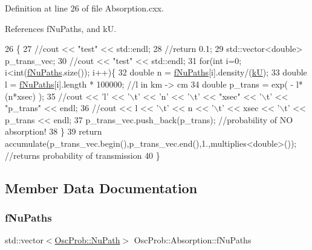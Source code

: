 Definition at line 26 of file Absorption.\+cxx.



References f\+Nu\+Paths, and kU.


\begin{DoxyCode}
26                                    \{
27   \textcolor{comment}{//cout << "test" << std::endl;}
28   \textcolor{comment}{//return 0.1;}
29   std::vector<double> p\_trans\_vec;
30   \textcolor{comment}{//cout << "test" << std::endl;}
31   \textcolor{keywordflow}{for}(\textcolor{keywordtype}{int} i=0; i<int(\hyperlink{classOscProb_1_1Absorption_aabe51d0748a0d48972780811e90acf69}{fNuPaths}.size()); i++)\{
32     \textcolor{keywordtype}{double} n = \hyperlink{classOscProb_1_1Absorption_aabe51d0748a0d48972780811e90acf69}{fNuPaths}[i].density/(\hyperlink{classOscProb_1_1Absorption_ab33e87a30b5761dbf7fca55ee9cb58a7}{kU});
33     \textcolor{keywordtype}{double} l = \hyperlink{classOscProb_1_1Absorption_aabe51d0748a0d48972780811e90acf69}{fNuPaths}[i].length * 100000; \textcolor{comment}{//l in km -> cm}
34     \textcolor{keywordtype}{double} p\_trans = exp( - l* (n*xsec) ); 
35     \textcolor{comment}{//cout << 'l' << '\(\backslash\)t' << 'n' << '\(\backslash\)t' << "xsec" << '\(\backslash\)t' << "p\_trans" << endl;}
36     \textcolor{comment}{//cout << l << '\(\backslash\)t' << n << '\(\backslash\)t' << xsec << '\(\backslash\)t' << p\_trans << endl;}
37     p\_trans\_vec.push\_back(p\_trans); \textcolor{comment}{//probability of NO absorption!}
38   \}
39   \textcolor{keywordflow}{return} accumulate(p\_trans\_vec.begin(),p\_trans\_vec.end(),1.,multiplies<double>()); \textcolor{comment}{//returns probability
       of transmission }
40 \}
\end{DoxyCode}


\subsection{Member Data Documentation}
\mbox{\label{classOscProb_1_1Absorption_aabe51d0748a0d48972780811e90acf69}} 
\subsubsection{\texorpdfstring{f\+Nu\+Paths}{fNuPaths}}
{\footnotesize\ttfamily std\+::vector$<$\hyperlink{structOscProb_1_1NuPath}{Osc\+Prob\+::\+Nu\+Path}$>$ Osc\+Prob\+::\+Absorption\+::f\+Nu\+Paths\hspace{0.3cm}{\ttfamily [protected]}}



